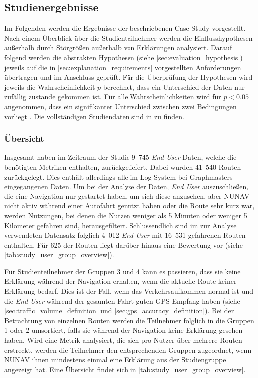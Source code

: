 \subsection{Studienergebnisse}
\label{sec:study_results_quantitativ}

Im Folgenden werden die Ergebnisse der beschriebenen Case-Study vorgestellt. Nach einem Überblick über die Studienteilnehmer werden die Einflusshypothesen außerhalb durch Störgrößen außerhalb von Erklärungen analysiert. Darauf folgend werden die abstrakten Hypothesen (siehe \autoref{sec:evaluation_hypothesis}) jeweils auf die in \autoref{sec:explanation_requirements} vorgestellten Anforderungen übertragen und im Anschluss geprüft. Für die Überprüfung der Hypothesen wird jeweils die Wahrscheinlichkeit $ p $ berechnet, dass ein Unterschied der Daten nur zufällig zustande gekommen ist. Für alle Wahrscheinlichkeiten wird für $ p < 0.05 $ angenommen, dass ein signifikanter Unterschied zwischen zwei Bedingungen vorliegt \cite[vgl.][]{wohlin2012experimentation}. Die vollständigen Studiendaten sind in  zu finden.

\subsubsection{Übersicht}

Insgesamt haben im Zeitraum der Studie 9~745 \textit{End User} Daten, welche die benötigten Metriken enthalten, zurückgeliefert. Dabei wurden 41~540 Routen zurückgelegt. Dies enthält allerdings alle im Log-System bei Graphmasters eingegangenen Daten. Um bei der Analyse der Daten, \textit{End User} auszuschließen, die eine Navigation nur gestartet haben, um sich diese anzusehen, aber NUNAV nicht aktiv während einer Autofahrt genutzt haben oder die Route sehr kurz war, werden Nutzungen, bei denen die Nutzen weniger als 5 Minuten oder weniger 5 Kilometer gefahren sind, herausgefiltert. Schlussendlich sind im zur Analyse verwendeten Datensatz folglich 4~012 \textit{End User} mit 16~531 gefahrenen Routen enthalten. Für 625 der Routen liegt darüber hinaus eine Bewertung vor (siehe \autoref{tab:study_user_group_overview}).

Für Studienteilnehmer der Gruppen 3 und 4 kann es passieren, dass sie keine Erklärung während der Navigation erhalten, wenn die aktuelle Route keiner Erklärung bedarf. Dies ist der Fall, wenn das Verkehrsaufkommen \glqq normal\grqq{} ist und die \textit{End User} während der gesamten Fahrt guten GPS-Empfang haben (siehe \autoref{sec:traffic_volume_definition} und \autoref{sec:gps_accuracy_definition}). Bei der Betrachtung von einzelnen Routen werden die Teilnehmer folglich in die Gruppen 1 oder 2 umsortiert, falls sie während der Navigation keine Erklärung gesehen haben. Wird eine Metrik analysiert, die sich pro Nutzer über mehrere Routen erstreckt, werden die Teilnehmer den entsprechenden Gruppen zugeordnet, wenn NUNAV ihnen mindestens einmal eine Erklärung aus der Studiengruppe angezeigt hat. Eine Übersicht findet sich in \autoref{tab:study_user_group_overview}.

